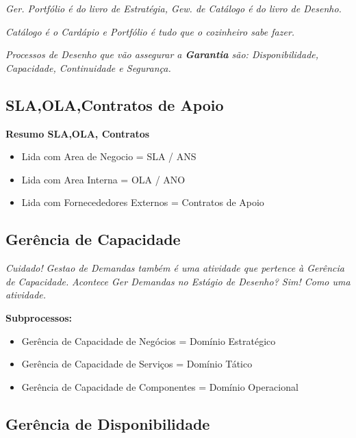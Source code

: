 \begin{center}
	\emph{Ger. Portfólio é do livro de Estratégia, Gew. de Catálogo é do livro de Desenho.}
\end{center}

\begin{center}
	\emph{Catálogo é o Cardápio e Portfólio é tudo que o cozinheiro sabe fazer.}
\end{center}

\begin{center}
	\emph{Processos de Desenho que vão assegurar a \textbf{Garantia} são: Disponibilidade, Capacidade, Continuidade e Segurança.}
\end{center}

\subsection{SLA,OLA,Contratos de Apoio}

\textbf{Resumo SLA,OLA, Contratos}
\begin{itemize}
	\item Lida com Area de Negocio = SLA / ANS
	\item Lida com Area Interna = OLA / ANO
	\item Lida com Fornecededores Externos = Contratos de Apoio
\end{itemize}

\subsection{Gerência de Capacidade}

\begin{center}
	\emph{Cuidado!}
	\emph{Gestao de Demandas também é uma atividade que pertence à Gerência de Capacidade.}
	\emph{Acontece Ger Demandas no Estágio de Desenho? Sim! Como uma atividade.}
\end{center}

\textbf{Subprocessos:}
\begin{itemize}
	\item Gerência de Capacidade de Negócios = Domínio Estratégico
	\item Gerência de Capacidade de Serviços = Domínio Tático
	\item Gerência de Capacidade de Componentes = Domínio Operacional
\end{itemize}

\subsection{Gerência de Disponibilidade}

